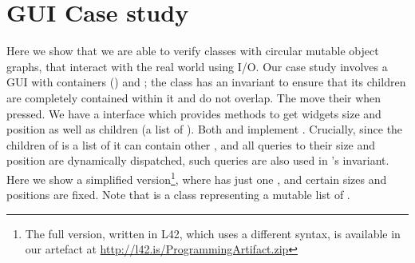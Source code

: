 \section{GUI Case study}
\label{s:case-study}
\saveSpace

%
%
%
%
%
%
%
Here we show that we are able to verify classes with circular mutable object graphs, that interact with the real world using I/O.
Our case study involves a GUI with containers (\Q@SafeMovable@s) and \Q@Button@s;
the \Q@SafeMovable@ class has an invariant to ensure that its children are completely contained within it and do not overlap. The \Q@Button@s move their \Q@SafeMovable@ when pressed. We have a \Q@Widget@ interface which provides methods to get widgets size and position as well as children (a list of \Q@Widget@s). Both \Q@SafeMovable@s and \Q@Button@s implement \Q@Widget@. Crucially, since the children of \Q@SafeMovable@ is a list of \Q@Widget@s it can contain other \Q@SafeMovable@s, and all queries to their size and position are dynamically dispatched, such queries are also used in \Q@SafeMovable@'s invariant.
Here we show a simplified version\footnote{The full version, written in L42, which uses a different syntax, is available in our artefact at \url{http://l42.is/ProgrammingArtifact.zip}}, where  \Q@SafeMovable@ has just one \Q@Button@, and certain sizes and positions are fixed. Note that \Q@Widgets@ is a class representing a mutable list of \Q@mut@ \Q@Widget@s.

